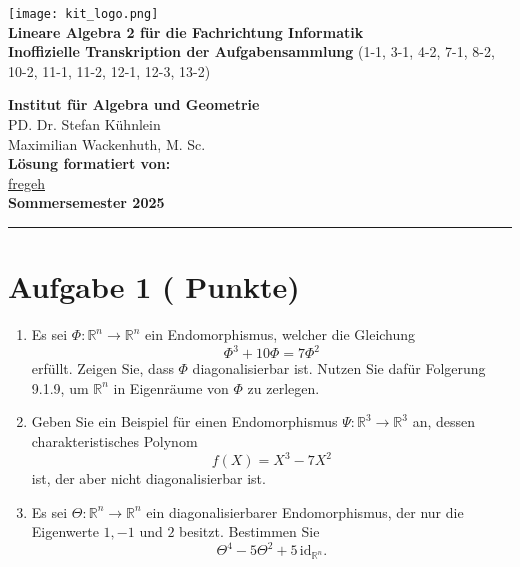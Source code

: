 \documentclass[11pt, a4paper]{article}
\newcommand{\aufgabe}[2]{%
  \section*{\Large\bfseries Aufgabe #1%
  \if\relax\detokenize{#2}\relax\else \hfill\normalfont\normalsize(#2 Punkte)\fi}%
  \vspace{-1.5ex}
}
\begin{document}
\noindent
\begin{minipage}[t]{0.6\textwidth}
    \vspace{0pt}
    \texttt{[image: kit\_logo.png]} \\ %
    {\Large\bfseries Lineare Algebra 2 für die Fachrichtung Informatik} \\[0.5em]
    {\large\bfseries Inoffizielle Transkription der Aufgabensammlung}
    {(1-1, 3-1, 4-2, 7-1, 8-2, 10-2, 11-1, 11-2, 12-1, 12-3, 13-2)}
\end{minipage}%
\begin{minipage}[t]{0.4\textwidth}
    \vspace{0pt}
    \raggedleft
    \small
    \textbf{Institut für Algebra und Geometrie} \\
    PD. Dr. Stefan Kühnlein \\
    Maximilian Wackenhuth, M. Sc. \\
    \vspace{0.5em}
    \textbf{Lösung formatiert von:} \\
    \href{https://github.com/fregeh}{fregeh} \\
    \vspace{1em}
    \textbf{Sommersemester 2025}
\end{minipage}

\vspace{0.5cm}
\hrule

\aufgabe{1}{}
\begin{enumerate}
  \item Es sei $\Phi:\mathbb{R}^n\to\mathbb{R}^n$ ein Endomorphismus, welcher die Gleichung
  \[
    \Phi^3+10\Phi=7\Phi^2
  \]
  erfüllt. Zeigen Sie, dass $\Phi$ diagonalisierbar ist. Nutzen Sie dafür Folgerung 9.1.9, um $\mathbb{R}^n$ in Eigenräume von $\Phi$ zu zerlegen.
  \begin{framed}\end{framed}

  \item Geben Sie ein Beispiel für einen Endomorphismus $\Psi:\mathbb{R}^3\to\mathbb{R}^3$ an, dessen charakteristisches Polynom
  \[
    f(X)=X^3-7X^2
  \]
  ist, der aber nicht diagonalisierbar ist.
  \begin{framed}\end{framed}

  \item Es sei $\Theta:\mathbb{R}^n\to\mathbb{R}^n$ ein diagonalisierbarer Endomorphismus, der nur die Eigenwerte $1,-1$ und $2$ besitzt. Bestimmen Sie
  \[
    \Theta^4-5\Theta^2+5\,\mathrm{id}_{\mathbb{R}^n}.
  \]
  \begin{framed}\end{framed}
\end{enumerate}
\end{document}
